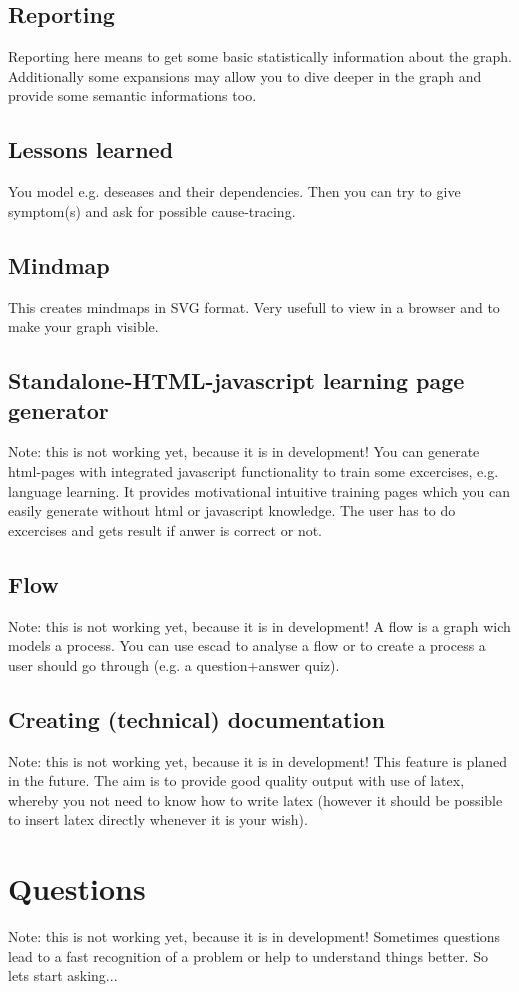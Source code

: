 \documentclass[a4paper, 12pt, openany]{scrbook}
\begin{document}
\subsection{Reporting}
Reporting here means to get some basic statistically information about the graph. Additionally some expansions may allow you to dive deeper in the graph and provide some semantic informations too.
\subsection{Lessons learned}
You model e.g. deseases and their dependencies. Then you can try to give symptom(s) and ask for possible cause-tracing.
\subsection{Mindmap}
This creates mindmaps in SVG format. Very usefull to view in a browser and to make your graph visible.
\subsection{Standalone-HTML-javascript learning page generator}
Note: this is not working yet, because it is in development!
You can generate html-pages with integrated javascript functionality to train some excercises, e.g. language learning. It provides motivational intuitive training pages which you can easily generate without html or javascript knowledge. The user has to do excercises and gets result if anwer is correct or not.
\subsection{Flow}
Note: this is not working yet, because it is in development!
A flow is a graph wich models a process. You can use escad to analyse a flow or to create a process a user should go through (e.g. a question+answer quiz).
\subsection{Creating (technical) documentation}
Note: this is not working yet, because it is in development!
This feature is planed in the future. The aim is to provide good quality output with use of latex, whereby you not need to know how to write latex (however it should be possible to insert latex directly whenever it is your wish).
\section{Questions}
Note: this is not working yet, because it is in development!
Sometimes questions lead to a fast recognition of a problem or help to understand things better. So lets start asking...
\end{document}
